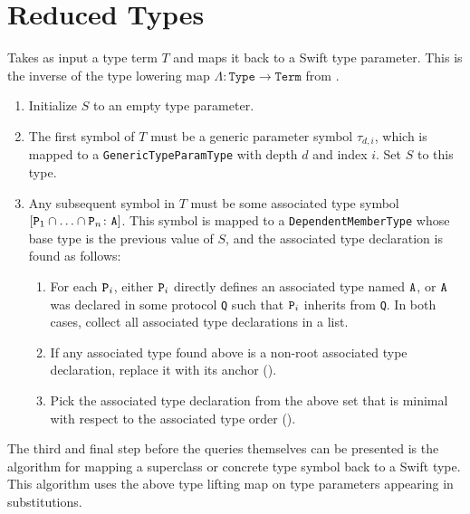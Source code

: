 \documentclass[../generics]{subfiles}
\begin{document}
\section{Reduced Types}\label{sec:rqm reduced types}

\begin{algorithm}\label{alg:build type from term protocol}

\end{algorithm}

\begin{algorithm}\label{alg:build type from term generic}
Takes as input
a type term $T$ and maps it back to a Swift type parameter. This is the inverse of the type lowering
map $\Lambda\colon\texttt{Type}\rightarrow\texttt{Term}$ from .
\begin{enumerate}
\item Initialize $S$ to an empty type parameter.
\item The first symbol of $T$ must be a generic parameter symbol $\tau_{d,i}$, which is mapped to a
\texttt{GenericTypeParamType} with depth $d$ and index $i$. Set $S$ to this type.
\item Any subsequent symbol in $T$ must be some associated type symbol
$[\texttt{P}_1\cap\ldots\cap\texttt{P}_n\colon\texttt{A}]$. This symbol is mapped to a
\texttt{DependentMemberType} whose base type is the previous value of $S$, and the associated type
declaration is found as follows:
\begin{enumerate}
\item For each $\texttt{P}_i$, either $\texttt{P}_i$ directly defines an associated type named
$\texttt{A}$, or $\texttt{A}$ was declared in some protocol \texttt{Q} such that $\texttt{P}_i$
inherits from \texttt{Q}. In both cases, collect all associated type declarations in a list.
\item If any associated type found above is a non-root associated type declaration, replace it with
its anchor ().
\item Pick the associated type declaration from the above set that is minimal with respect to the
associated type order ().
\end{enumerate}
\end{enumerate}
\end{algorithm}

The third and final step before the queries themselves can be presented is the algorithm for mapping a superclass or concrete type symbol back to a Swift type. This algorithm uses the above type lifting map on type parameters appearing in substitutions.
\end{document}
